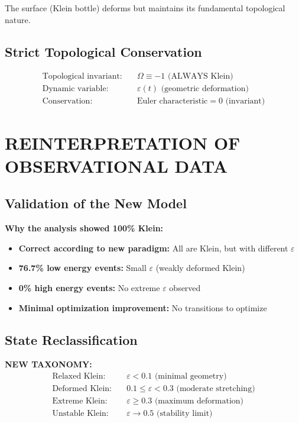 \documentclass[12pt,a4paper]{article}
\begin{document}
The surface (Klein bottle) deforms but maintains its fundamental topological nature.

\subsection{Strict Topological Conservation}

\begin{align}
\text{Topological invariant:} &\quad \Omega \equiv -1 \text{ (ALWAYS Klein)}\\
\text{Dynamic variable:} &\quad \varepsilon(t) \text{ (geometric deformation)}\\
\text{Conservation:} &\quad \text{Euler characteristic} = 0 \text{ (invariant)}
\end{align}

\section{REINTERPRETATION OF OBSERVATIONAL DATA}

\subsection{Validation of the New Model}

\textbf{Why the analysis showed 100\% Klein:}
\begin{itemize}
\item[\checkmark] \textbf{Correct according to new paradigm:} All are Klein, but with different $\varepsilon$
\item[\checkmark] \textbf{76.7\% low energy events:} Small $\varepsilon$ (weakly deformed Klein)
\item[\checkmark] \textbf{0\% high energy events:} No extreme $\varepsilon$ observed
\item[\checkmark] \textbf{Minimal optimization improvement:} No transitions to optimize
\end{itemize}

\subsection{State Reclassification}

\textbf{NEW TAXONOMY:}
\begin{align}
\text{Relaxed Klein:} &\quad \varepsilon < 0.1 \text{ (minimal geometry)}\\
\text{Deformed Klein:} &\quad 0.1 \leq \varepsilon < 0.3 \text{ (moderate stretching)}\\
\text{Extreme Klein:} &\quad \varepsilon \geq 0.3 \text{ (maximum deformation)}\\
\text{Unstable Klein:} &\quad \varepsilon \to 0.5 \text{ (stability limit)}
\end{align}
\end{document}
